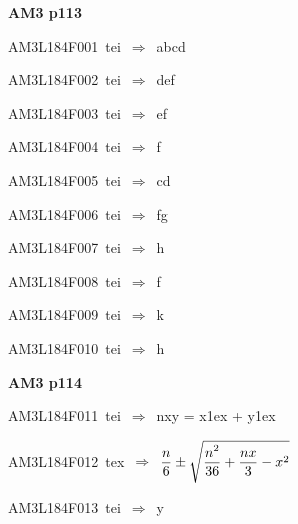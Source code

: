 \par\vfill\eject
{\bf\hfill AM3 p113\hfill\hbox{}}\par\bigskip
{\sixrm AM3L184F001\ {\sixit tei}\ }$\Rightarrow$\ {\tenit abcd}\par\smallskip
{\sixrm AM3L184F002\ {\sixit tei}\ }$\Rightarrow$\ {\tenit def}\par\smallskip
{\sixrm AM3L184F003\ {\sixit tei}\ }$\Rightarrow$\ {\tenit ef}\par\smallskip
{\sixrm AM3L184F004\ {\sixit tei}\ }$\Rightarrow$\ {\tenit f}\par\smallskip
{\sixrm AM3L184F005\ {\sixit tei}\ }$\Rightarrow$\ {\tenit cd}\par\smallskip
{\sixrm AM3L184F006\ {\sixit tei}\ }$\Rightarrow$\ {\tenit fg}\par\smallskip
{\sixrm AM3L184F007\ {\sixit tei}\ }$\Rightarrow$\ {\tenit h}\par\smallskip
{\sixrm AM3L184F008\ {\sixit tei}\ }$\Rightarrow$\ {\tenit f}\par\smallskip
{\sixrm AM3L184F009\ {\sixit tei}\ }$\Rightarrow$\ {\tenit k}\par\smallskip
{\sixrm AM3L184F010\ {\sixit tei}\ }$\Rightarrow$\ {\tenit h}\par\smallskip

\par\vfill\eject
{\bf\hfill AM3 p114\hfill\hbox{}}\par\bigskip
{\sixrm AM3L184F011\ {\sixit tei}\ }$\Rightarrow$\ {\tenit nxy} = {\tenit x}\raise1ex\hbox{} + {\tenit y}\raise1ex\hbox{}\par\smallskip
{\sixrm AM3L184F012\ {\sixit tex}\ }$\Rightarrow$\ ${\displaystyle\strut n\over \displaystyle\strut 6} \pm  \sqrt{{\displaystyle\strut n^{2}\over \displaystyle\strut 36} + {\displaystyle\strut {nx}\over \displaystyle\strut 3} - x^{2}}$\par\smallskip
{\sixrm AM3L184F013\ {\sixit tei}\ }$\Rightarrow$\ {\tenit y}\par\smallskip


